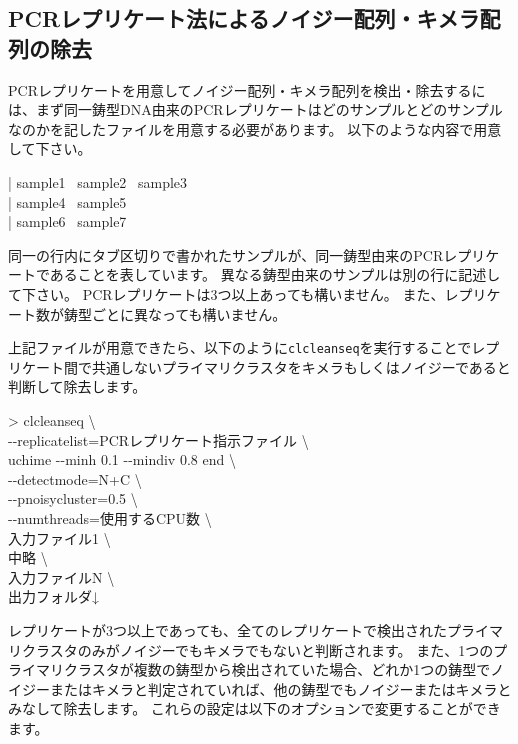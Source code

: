 \documentclass[titlepage,10pt,a4paper]{jsbook}
\newenvironment{content}{\begin{shaded}\vspace{-1em}\raggedright\ttfamily\footnotesize\setlength{\baselineskip}{1.4em}}{\end{shaded}\vspace{-1em}}
\newenvironment{cmd}{\begin{oframed}\raggedright\ttfamily\footnotesize\setlength{\baselineskip}{1.4em}}{\end{oframed}\vspace{-1em}}
\begin{document}
\subsection{PCRレプリケート法によるノイジー配列・キメラ配列の除去}

PCRレプリケートを用意してノイジー配列・キメラ配列を検出・除去するには、まず同一鋳型DNA由来のPCRレプリケートはどのサンプルとどのサンプルなのかを記したファイルを用意する必要があります。
以下のような内容で用意して下さい。

\begin{content}
| sample1~ sample2~ sample3\\
| sample4~ sample5\\
| sample6~ sample7
\end{content}

同一の行内にタブ区切りで書かれたサンプルが、同一鋳型由来のPCRレプリケートであることを表しています。
異なる鋳型由来のサンプルは別の行に記述して下さい。
PCRレプリケートは3つ以上あっても構いません。
また、レプリケート数が鋳型ごとに異なっても構いません。

上記ファイルが用意できたら、以下のように\texttt{clcleanseq}を実行することでレプリケート間で共通しないプライマリクラスタをキメラもしくはノイジーであると判断して除去します。

\begin{cmd}
{\textgreater} clcleanseq {\textbackslash}\\
{-}{-}replicatelist=PCRレプリケート指示ファイル {\textbackslash}\\
uchime {-}{-}minh 0.1 {-}{-}mindiv 0.8 end {\textbackslash}\\
{-}{-}detectmode=N+C {\textbackslash}\\
{-}{-}pnoisycluster=0.5 {\textbackslash}\\
{-}{-}numthreads=使用するCPU数 {\textbackslash}\\
入力ファイル1 {\textbackslash}\\
中略 {\textbackslash}\\
入力ファイルN {\textbackslash}\\
出力フォルダ↓
\end{cmd}

レプリケートが3つ以上であっても、全てのレプリケートで検出されたプライマリクラスタのみがノイジーでもキメラでもないと判断されます。
また、1つのプライマリクラスタが複数の鋳型から検出されていた場合、どれか1つの鋳型でノイジーまたはキメラと判定されていれば、他の鋳型でもノイジーまたはキメラとみなして除去します。
これらの設定は以下のオプションで変更することができます。
\end{document}
